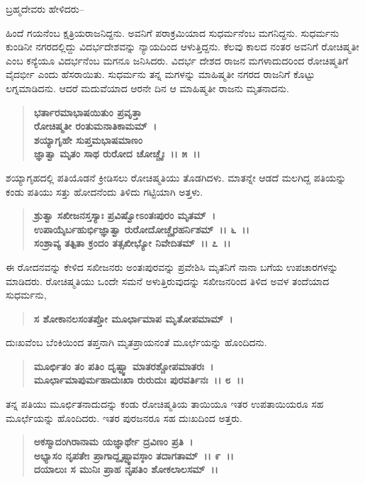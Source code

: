 \begin{flushleft}
ಬ್ರಹ್ಮದೇವರು ಹೇಳಿದರು–
\end{flushleft}

ಹಿಂದೆ ಗಯನೆಂಬ ಕ್ಷತ್ರಿಯರಾಜನಿದ್ದನು. ಅವನಿಗೆ ಪರಾಕ್ರಮಿಯಾದ ಸುಧರ್ಮನೆಂಬ ಮಗನಿದ್ದನು. ಸುಧರ್ಮನು ಕುಂಡಿನೀ ನಗರದಲ್ಲಿದ್ದು ವಿದರ್ಭದೇಶವನ್ನು ನ್ಯಾಯದಿಂದ ಆಳುತ್ತಿದ್ದನು. ಕೆಲವು ಕಾಲದ ನಂತರ ಅವನಿಗೆ ರೋಚಿಷ್ಮತೀ ಎಂಬ ಕನ್ಯೆಯೂ ವಿದರ್ಭನೆಂಬ ಮಗನೂ ಜನಿಸಿದರು. ವಿದರ್ಭ ದೇಶದ ರಾಜನ ಮಗಳಾದುದರಿಂದ ರೋಚಿಷ್ಮತಿಗೆ ವೈದರ್ಭೀ ಎಂದು ಹೆಸರಾಯಿತು. ಸುಧರ್ಮನು ತನ್ನ ಮಗಳನ್ನು ಮಾಹಿಷ್ಮತೀ ನಗರದ ರಾಜನಿಗೆ ಕೊಟ್ಟು ಲಗ್ನಮಾಡಿದನು. ಆದರೆ ಮದುವೆಯಾದ ಆರನೇ ದಿನ ಆ ಮಾಹಿಷ್ಮತೀ ರಾಜನು ಮೃತನಾದನು.

\begin{verse}
\textbf{ಭರ್ತಾರಮಾಭಾಷಯಿತುಂ ಪ್ರವೃತ್ತಾ} \\\textbf{ರೋಚಿಷ್ಮತೀ ರಂತುಮನಾತಿಕಾಮಮ್~।}\\\textbf{ಶಯ್ಯಾಗೃಹೇ ಸುಪ್ತಮಭಾಷಮಾಣಂ }\\\textbf{ಜ್ಞಾತ್ವಾ ಮೃತಂ ಸಾಥ ರುರೋದ ಚೋಚ್ಚೈಃ~।। ೫~।।}
\end{verse}

ಶಯ್ಯಾಗೃಹದಲ್ಲಿ ಪತಿಯೊಡನೆ ಕ್ರೀಡಿಸಲು ರೋಚಿಷ್ಮತಿಯು ತೊಡಗಿದಳು. ಮಾತನ್ನೇ ಆಡದೆ ಮಲಗಿದ್ದ ಪತಿಯನ್ನು ಕಂಡು ಪತಿಯು ಸತ್ತು ಹೋದನೆಂದು ತಿಳಿದು ಗಟ್ಟಿಯಾಗಿ ಅತ್ತಳು.

\begin{verse}
\textbf{ಶ್ರುತ್ವಾ ಸಖೀಜನಸ್ತಸ್ಯಾಃ ಪ್ರವಿಷ್ವೋಽಂತಃಪುರಂ ಮೃತಮ್~।}\\\textbf{ಉಪಾಯೈರ್ಬಹುರ್ಭಿಜ್ಞಾತ್ವಾ ರುರೋದೋಚ್ಚೈರಹರ್ನಿಶಮ್~।। ೬~।।}\\\textbf{ಸಂಶ್ರಾವ್ಯ ತತ್ಪಿತಾ ಕ್ರಂದಂ ತತ್ಸಖೀಭ್ಯೋ ನಿವೇದಿತಮ್~।। ೭~।।}
\end{verse}

ಈ ರೋದನವನ್ನು ಕೇಳಿದ ಸಖೀಜನರು ಅಂತಃಪುರವನ್ನು ಪ್ರವೇಶಿಸಿ ಮೃತನಿಗೆ ನಾನಾ ಬಗೆಯ ಉಪಚಾರಗಳನ್ನು ಮಾಡಿದರು. ರೋಚಿಷ್ಮತಿಯು ಒಂದೇ ಸಮನೆ ಅಳುತ್ತಿರುವುದನ್ನು ಸಖೀಜನರಿಂದ ತಿಳಿದ ಅವಳ ತಂದೆಯಾದ ಸುಧರ್ಮನು,

\begin{verse}
\textbf{ಸ ಶೋಕಾನಲಸಂತಪ್ತೋ ಮೂರ್ಛಾಮಾಪ ಮೃತೋಪಮಾಮ್~।}
\end{verse}

ದುಃಖವೆಂಬ ಬೆಂಕಿಯಿಂದ ತಪ್ತನಾಗಿ ಮೃತಪ್ರಾಯನಂತೆ ಮೂರ್ಛೆಯನ್ನು ಹೊಂದಿದನು.

\begin{verse}
\textbf{ಮೂರ್ಛಿತಂ ತಂ ಪತಿಂ ದೃಷ್ಟ್ವಾ ಮಾತರಶ್ಚೋಪಮಾತರಃ~।}\\\textbf{ಮೂರ್ಛಾಮಾಪುರ್ಮಹಾದುಃಖಾ ರುರುದುಃ ಪುರವರ್ತಿನಃ~।। ೮~।।}
\end{verse}

ತನ್ನ ಪತಿಯು ಮೂರ್ಛಿತನಾದುದನ್ನು ಕಂಡು ರೋಚಿಷ್ಮತಿಯ ತಾಯಿಯೂ ಇತರ ಉಪತಾಯಿಯರೂ ಸಹ ಮೂರ್ಛೆಯನ್ನು ಹೊಂದಿದರು. ಇತರ ಪುರಜನರೂ ಸಹ ದುಃಖದಿಂದ ಅತ್ತರು.

\begin{verse}
\textbf{ಅಕಸ್ಮಾದಂಗಿರಾನಾಮ ಯಜ್ಞಾರ್ಥೇ ದ್ರವಿಣಂ ಪ್ರತಿ~।}\\\textbf{ಅಭ್ಯಾಸಂ ನೃಪತೇಃ ಪ್ರಾಗಾದ್ದೃಷ್ಟ್ವಾವಸ್ಠಾಂ ತದಾಗತಾಮ್~।। ೯~।। }\\\textbf{ದಯಾಲುಃ ಸ ಮುನಿಃ ಪ್ರಾಹ ನೃಪತಿಂ ಶೋಕಲಾಲಸಮ್~।।}
\end{verse}

